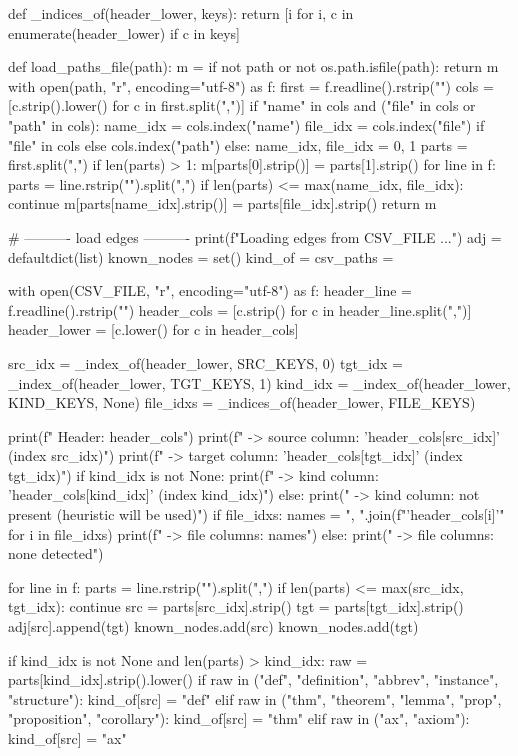 \documentclass[11pt,reqno]{amsart}
\begin{document}
\begin{verbatimbox}
def _indices_of(header_lower, keys):
return [i for i, c in enumerate(header_lower) if c in keys]

def load_paths_file(path):
m = {}
if not path or not os.path.isfile(path):
return m
with open(path, "r", encoding="utf-8") as f:
first = f.readline().rstrip("\n")
cols = [c.strip().lower() for c in first.split(",")]
if "name" in cols and ("file" in cols or "path" in cols):
name_idx = cols.index("name")
file_idx = cols.index("file") if "file" in cols else cols.index("path")
else:
name_idx, file_idx = 0, 1
parts = first.split(",")
if len(parts) > 1:
m[parts[0].strip()] = parts[1].strip()
for line in f:
parts = line.rstrip("\n").split(",")
if len(parts) <= max(name_idx, file_idx):
continue
m[parts[name_idx].strip()] = parts[file_idx].strip()
return m

# ---------- load edges ----------
print(f"Loading edges from {CSV_FILE} ...")
adj = defaultdict(list)
known_nodes = set()
kind_of = {}
csv_paths = {}

with open(CSV_FILE, "r", encoding="utf-8") as f:
header_line = f.readline().rstrip("\n")
header_cols = [c.strip() for c in header_line.split(",")]
header_lower = [c.lower() for c in header_cols]

src_idx  = _index_of(header_lower, SRC_KEYS, 0)
tgt_idx  = _index_of(header_lower, TGT_KEYS, 1)
kind_idx = _index_of(header_lower, KIND_KEYS, None)
file_idxs = _indices_of(header_lower, FILE_KEYS)

print(f"  Header: {header_cols}")
print(f"  -> source column: '{header_cols[src_idx]}' (index {src_idx})")
print(f"  -> target column: '{header_cols[tgt_idx]}' (index {tgt_idx})")
if kind_idx is not None:
print(f"  -> kind column:   '{header_cols[kind_idx]}' (index {kind_idx})")
else:
print("  -> kind column:   not present (heuristic will be used)")
if file_idxs:
names = ", ".join(f"'{header_cols[i]}'" for i in file_idxs)
print(f"  -> file columns:  {names}")
else:
print("  -> file columns:  none detected")

for line in f:
parts = line.rstrip("\n").split(",")
if len(parts) <= max(src_idx, tgt_idx):
continue
src = parts[src_idx].strip()
tgt = parts[tgt_idx].strip()
adj[src].append(tgt)
known_nodes.add(src)
known_nodes.add(tgt)

if kind_idx is not None and len(parts) > kind_idx:
raw = parts[kind_idx].strip().lower()
if raw in ("def", "definition", "abbrev", "instance", "structure"):
kind_of[src] = "def"
elif raw in ("thm", "theorem", "lemma", "prop", "proposition",
"corollary"):
kind_of[src] = "thm"
elif raw in ("ax", "axiom"):
kind_of[src] = "ax"


\end{verbatimbox}
\end{document}
